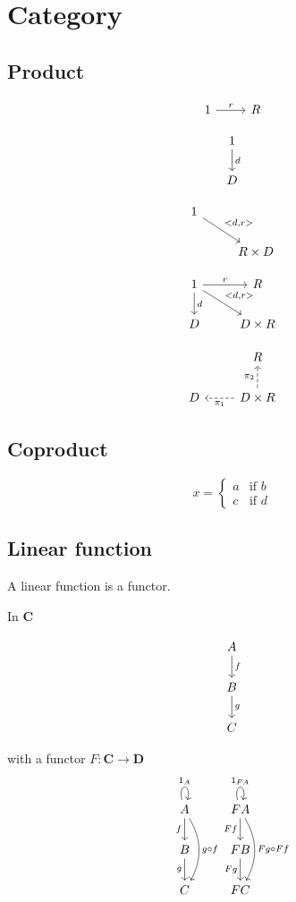 \section{Category}

\subsection{Product}

\[\begin{tikzcd}
    1 \ar[r, "r"]   & R
\end{tikzcd}\]

\[\begin{tikzcd}
    1 \ar[d, "d"] \\ 
    D
\end{tikzcd}\]

\[\begin{tikzcd}
    1 \ar{rd}{<d, r>} \\
                        & R \times D
\end{tikzcd}\]

\[\begin{tikzcd}
    1 \ar{r}{r} \ar{d}{d} \ar{rd}{<d, r>}  & R \\
    D                                      & D \times R
\end{tikzcd}\]

\[\begin{tikzcd}
      & R \\
    D & D \times R \ar[dashrightarrow]{u}{\pi_2} \ar[dashrightarrow]{l}{\pi_1}  
\end{tikzcd}\]

\subsection{Coproduct}

\[
x = \begin{cases}
   a &\text{if } b \\
   c &\text{if } d
\end{cases}
\]

\subsection{Linear function}

A linear function is a functor.

In $ \mathbf{C} $

\[\begin{tikzcd}
    A \ar[d, "f"] \\ 
    B \ar[d, "g"] \\
    C
\end{tikzcd}\]

with a functor $ F : \mathbf{C} \to \mathbf{D} $
\[\begin{tikzcd}
    A \ar[swap, d, "f"] \ar[loop above, "1_A"] \ar[bend left, dd, "g \circ f"] 
        & FA \ar[swap]{d}{Ff} \ar[loop above, "1_{FA}"] \ar[bend left]{dd}{Fg \circ Ff} \\ 
    B \ar[swap, d, "g"]                       
        & FB \ar[swap]{d}{Fg} \\
    C   
        & FC
\end{tikzcd}\]

